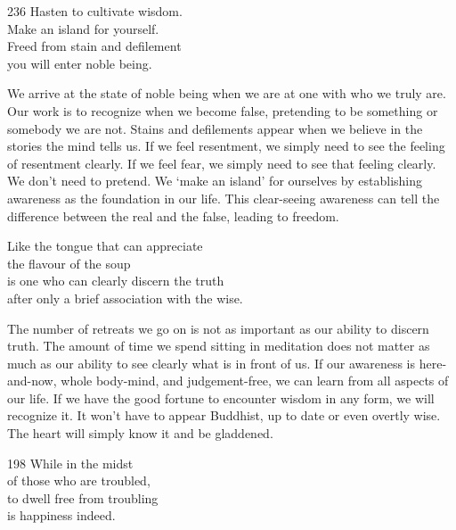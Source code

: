 
\begin{dhpVerse}{236}
\label{dhp-236}
Hasten to cultivate wisdom.\\
Make an island for yourself.\\
Freed from stain and defilement\\
you will enter noble being.
\end{dhpVerse}

\begin{dhpRefl}
  We arrive at the state of noble being when we are at one with who we truly
  are. Our work is to recognize when we become false, pretending to be something
  or somebody we are not. Stains and defilements appear when we believe in the
  stories the mind tells us. If we feel resentment, we simply need to see the
  feeling of resentment clearly. If we feel fear, we simply need to see that
  feeling clearly. We don't need to pretend. We `make an island' for ourselves
  by establishing awareness as the foundation in our life. This clear-seeing
  awareness can tell the difference between the real and the false, leading to
  freedom.
\end{dhpRefl}


\begin{dhpVerse}{65}
\label{dhp-65}
Like the tongue that can appreciate\\
the flavour of the soup\\
is one who can clearly discern the truth\\
after only a brief association with the wise.
\end{dhpVerse}

\begin{dhpRefl}
  The number of retreats we go on is not as important as our ability to discern
  truth. The amount of time we spend sitting in meditation does not matter as
  much as our ability to see clearly what is in front of us. If our awareness is
  here-and-now, whole body-mind, and judgement-free, we can learn from all
  aspects of our life. If we have the good fortune to encounter wisdom in any
  form, we will recognize it. It won't have to appear Buddhist, up to date or
  even overtly wise. The heart will simply know it and be gladdened.
\end{dhpRefl}


\begin{dhpVerse}{198}
\label{dhp-198}
While in the midst\\
of those who are troubled,\\
to dwell free from troubling\\
is happiness indeed.
\end{dhpVerse}

